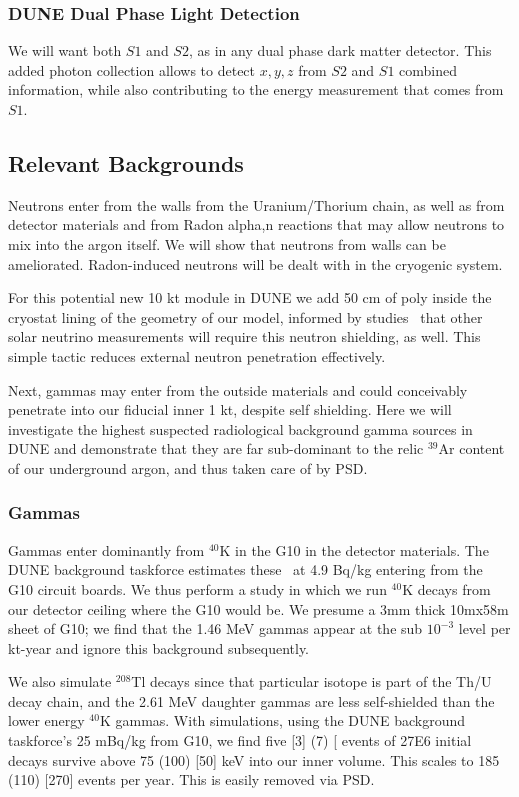 \documentclass[a4paper,11pt]{article}
\begin{document}
\subsubsection{DUNE Dual Phase Light Detection}
 We will want both $S1$ and $S2$, as in any dual phase dark matter detector. This added photon collection allows to detect $x,y,z$ from $S2$ and $S1$ combined information, while also contributing to the energy measurement that comes from $S1$.

\subsection{Relevant Backgrounds}
Neutrons enter from the walls from the Uranium/Thorium chain, as well as from detector materials and from Radon alpha,n reactions that may allow neutrons to mix into the argon itself. We will show that neutrons from walls can be ameliorated. Radon-induced neutrons will be dealt with in the cryogenic system.

For this potential new 10 kt module in DUNE we add 50 cm of poly inside the cryostat lining of the geometry of our model, informed by studies~\cite{beacom} that other solar neutrino measurements will require this neutron shielding, as well. This simple tactic reduces external neutron penetration effectively.

Next, gammas may enter from the outside materials and could conceivably penetrate into our fiducial inner 1 kt, despite self shielding. Here we will investigate the highest suspected radiological background gamma sources in DUNE and demonstrate that they are far sub-dominant to the relic $^{39}$Ar content of our underground argon, and thus taken care of by PSD.

\subsubsection{Gammas}
Gammas enter dominantly from $^{40}$K in the G10 in the detector materials. The DUNE background taskforce estimates these~\cite{bgd-taskforce} at 4.9 Bq/kg entering from the G10 circuit boards. We thus perform a study in which we run $^{40}$K decays from our detector ceiling where the G10 would be. We presume a 3mm thick 10mx58m sheet of G10; we find that the 1.46 MeV gammas appear at the sub $10^{-3}$ level per kt-year and ignore this background subsequently.

We also simulate $^{208}$Tl decays since that particular isotope is part of the Th/U decay chain, and the 2.61 MeV daughter gammas are less self-shielded than the lower energy $^{40}$K gammas. With simulations, using the DUNE background taskforce's 25 mBq/kg from G10, we find five [3] (7) [ events of 27E6 initial decays survive above 75 (100) [50] keV into our inner volume. This scales to 185 (110) [270] events per year. This is easily removed via PSD.
\end{document}
